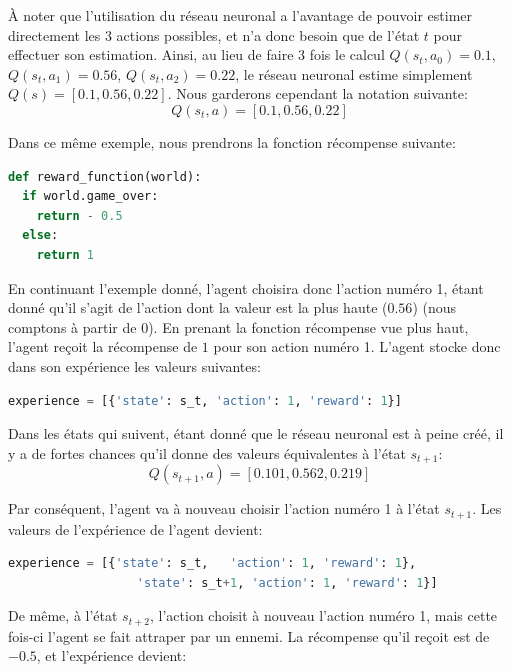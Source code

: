 \documentclass[11pt,a4paper]{report}
\begin{document}
  \par À noter que l'utilisation du réseau neuronal a l'avantage de pouvoir estimer directement les 3 actions possibles, et n'a donc besoin que de l'état $t$ pour effectuer son estimation. Ainsi, au lieu de faire 3 fois le calcul $Q(s_t,a_0) = 0.1$, $Q(s_t,a_1) = 0.56$, $Q(s_t,a_2) = 0.22$, le réseau neuronal estime simplement $Q(s) = [0.1, 0.56, 0.22]$. Nous garderons cependant la notation suivante: 
  $$Q(s_t, a) = [0.1, 0.56, 0.22]$$
  
  \par Dans ce même exemple, nous prendrons la fonction récompense suivante: 
  
  \begin{lstlisting}[language=python]
def reward_function(world):
  if world.game_over:
    return - 0.5
  else:
    return 1
  \end{lstlisting} 
  
  \par En continuant l'exemple donné, l'agent choisira donc l'action numéro 1, étant donné qu'il s'agit de l'action dont la valeur est la plus haute ($0.56$) (nous comptons à partir de 0). En prenant la fonction récompense vue plus haut, l'agent reçoit la récompense de $1$ pour son action numéro 1. L'agent stocke donc dans son expérience les valeurs suivantes: 
  
  \begin{lstlisting}[language=python]
   experience = [{'state': s_t, 'action': 1, 'reward': 1}]
  \end{lstlisting}
  
  \par Dans les états qui suivent, étant donné que le réseau neuronal est à peine créé, il y a de fortes chances qu'il donne des valeurs équivalentes à l'état $s_{t+1}$: 
  $$Q(s_{t+1}, a) = [0.101, 0.562, 0.219]$$
  
  
  \par Par conséquent, l'agent va à nouveau choisir l'action numéro 1 à l'état $s_{t+1}$. Les valeurs de l'expérience de l'agent devient: 

  \begin{lstlisting}[language=python]
   experience = [{'state': s_t,   'action': 1, 'reward': 1},
                  'state': s_t+1, 'action': 1, 'reward': 1}]
  \end{lstlisting}  
  
  \par De même, à l'état $s_{t+2}$, l'action choisit à nouveau l'action numéro 1, mais cette fois-ci l'agent se fait attraper par un ennemi. La récompense qu'il reçoit est de $-0.5$, et l’expérience devient: 
  
\end{document}
